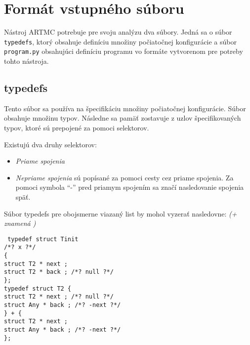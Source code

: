 \section{Formát vstupného súboru}
Nástroj ARTMC potrebuje pre svoju analýzu dva súbory. Jedná sa o súbor \texttt{typedefs}, ktorý obsahuje definíciu množiny počiatočnej konfigurácie a súbor \texttt{program.py} obsahujúci definíciu programu vo formáte vytvorenom pre potreby tohto nástroja.

\subsection{typedefs}
Tento súbor sa používa na špecifikáciu množiny počiatočnej konfigurácie. Súbor obsahuje množinu typov. Následne sa pamäť zostavuje z uzlov špecifikovaných typov, ktoré sú prepojené za pomoci selektorov.

Existujú dva druhy selektorov:
\begin{itemize}
\item \textit{Priame spojenia}
\item \textit{Nepriame spojenia} sú popísané za pomoci cesty cez priame spojenia. Za pomoci symbola ``-'' pred priamym spojením sa značí nasledovanie spojenia späť.
\end{itemize}

Súbor typedefs pre obojsmerne viazaný list by mohol vyzerať nasledovne: \textit{(+ znamená )}

\texttt{
typedef struct Tinit\\                                                            
/*? x ?*/\\                                                                       
\{\\
  struct T2 * next ;\\                                                           
  struct T2 * back ; /*? null ?*/\\                                               
\};
                                                                                \\
typedef struct T2                                                           
\{\\
  struct T2 * next ; /*? null ?*/\\                                               
  struct Any * back ; /*? -next ?*/\\
\}
+
\{\\
  struct T2 * next ;\\                                                           
  struct Any * back ; /*? -next ?*/\\                                             
\};
}

